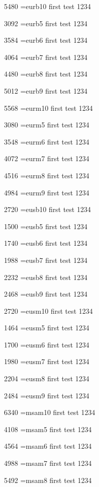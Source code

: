 5480	\tstfont \font\tstfont=eurb10 first test 1234 

3092	\tstfont \font\tstfont=eurb5 first test 1234 

3584	\tstfont \font\tstfont=eurb6 first test 1234 

4064	\tstfont \font\tstfont=eurb7 first test 1234 

4480	\tstfont \font\tstfont=eurb8 first test 1234 

5012	\tstfont \font\tstfont=eurb9 first test 1234 

5568	\tstfont \font\tstfont=eurm10 first test 1234 

3080	\tstfont \font\tstfont=eurm5 first test 1234 

3548	\tstfont \font\tstfont=eurm6 first test 1234 

4072	\tstfont \font\tstfont=eurm7 first test 1234 

4516	\tstfont \font\tstfont=eurm8 first test 1234 

4984	\tstfont \font\tstfont=eurm9 first test 1234 

2720	\tstfont \font\tstfont=eusb10 first test 1234 

1500	\tstfont \font\tstfont=eusb5 first test 1234 

1740	\tstfont \font\tstfont=eusb6 first test 1234 

1988	\tstfont \font\tstfont=eusb7 first test 1234 

2232	\tstfont \font\tstfont=eusb8 first test 1234 

2468	\tstfont \font\tstfont=eusb9 first test 1234 

2720	\tstfont \font\tstfont=eusm10 first test 1234 

1464	\tstfont \font\tstfont=eusm5 first test 1234 

1700	\tstfont \font\tstfont=eusm6 first test 1234 

1980	\tstfont \font\tstfont=eusm7 first test 1234 

2204	\tstfont \font\tstfont=eusm8 first test 1234 

2484	\tstfont \font\tstfont=eusm9 first test 1234 

6340	\tstfont \font\tstfont=msam10 first test 1234 

4108	\tstfont \font\tstfont=msam5 first test 1234 

4564	\tstfont \font\tstfont=msam6 first test 1234 

4988	\tstfont \font\tstfont=msam7 first test 1234 

5492	\tstfont \font\tstfont=msam8 first test 1234 

